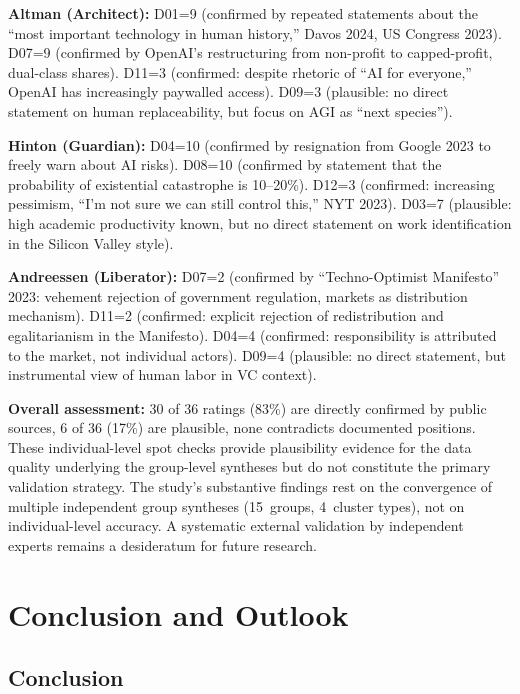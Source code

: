 \documentclass[12pt,a4paper]{article}
\begin{document}
\textbf{Altman (Architect):} D01=9 (confirmed by repeated statements about the ``most important technology in human history,'' Davos 2024, US Congress 2023). D07=9 (confirmed by OpenAI's restructuring from non-profit to capped-profit, dual-class shares). D11=3 (confirmed: despite rhetoric of ``AI for everyone,'' OpenAI has increasingly paywalled access). D09=3 (plausible: no direct statement on human replaceability, but focus on AGI as ``next species'').

\textbf{Hinton (Guardian):} D04=10 (confirmed by resignation from Google 2023 to freely warn about AI risks). D08=10 (confirmed by statement that the probability of existential catastrophe is 10--20\%). D12=3 (confirmed: increasing pessimism, ``I'm not sure we can still control this,'' NYT 2023). D03=7 (plausible: high academic productivity known, but no direct statement on work identification in the Silicon Valley style).

\textbf{Andreessen (Liberator):} D07=2 (confirmed by ``Techno-Optimist Manifesto'' 2023: vehement rejection of government regulation, markets as distribution mechanism). D11=2 (confirmed: explicit rejection of redistribution and egalitarianism in the Manifesto). D04=4 (confirmed: responsibility is attributed to the market, not individual actors). D09=4 (plausible: no direct statement, but instrumental view of human labor in VC context).

\textbf{Overall assessment:} 30 of 36 ratings (83\%) are directly confirmed by public sources, 6 of 36 (17\%) are plausible, none contradicts documented positions. These individual-level spot checks provide plausibility evidence for the data quality underlying the group-level syntheses but do not constitute the primary validation strategy. The study's substantive findings rest on the convergence of multiple independent group syntheses (15~groups, 4~cluster types), not on individual-level accuracy. A systematic external validation by independent experts remains a desideratum for future research.


\section{Conclusion and Outlook}
\label{sec:fazit}

\subsection{Conclusion}
\end{document}
